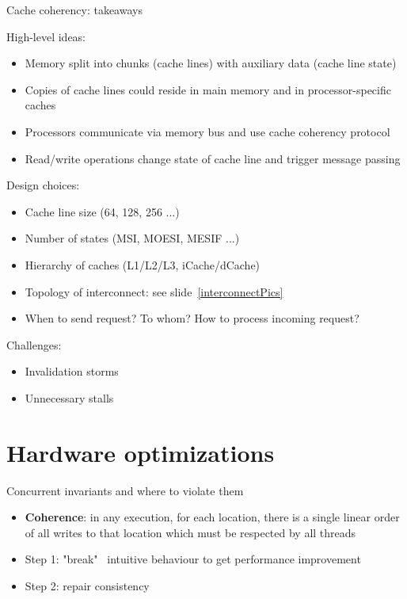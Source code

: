 \begin{frame}{Cache coherency: takeaways}

High-level ideas:
\begin{itemize}
    \item Memory split into chunks (cache lines) with auxiliary data (cache line state)
    \pause
    \item Copies of cache lines could reside in main memory and in processor-specific caches
    \pause
    \item Processors communicate via memory bus and use cache coherency protocol
    \pause
    \item Read/write operations change state of cache line and trigger message passing
\end{itemize}

\pause
Design choices:
\begin{itemize}
    \pause
    \item Cache line size (64, 128, 256 ...)
    \pause
    \item Number of states (MSI, MOESI, MESIF ...)
    \pause
    \item Hierarchy of caches (L1/L2/L3, iCache/dCache)
    \pause
    \item Topology of interconnect: see slide~\ref{interconnectPics}
    \pause
    \item When to send request? To whom? How to process incoming request?
\end{itemize}

\pause
Challenges:
\begin{itemize}
    \pause
    \item Invalidation storms
    \pause
    \item Unnecessary stalls 
\end{itemize}

\end{frame}

\section{Hardware optimizations} %
\showTOC

\begin{frame}{Concurrent invariants and where to violate them}

\begin{itemize}
    \item \textbf{Coherence}: in any execution, for each location, there is a single linear order of all writes to that location which must be respected by all threads
\end{itemize}

\begin{itemize}
    \item Step 1: "break" \ intuitive behaviour to get performance improvement
    \item Step 2: repair consistency
\end{itemize}
\end{frame}


